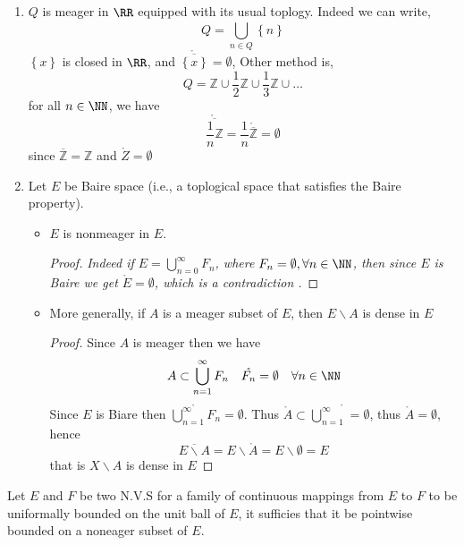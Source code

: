 \begin{example}
\begin{enumerate}
\item $Q $ is meager in $\RR  $ equipped with its usual toplogy.
	Indeed we can write, 
	\[
	Q = \bigcup_{n \in Q}^{}  \left\{ n \right\}
	\]
	$\left\{ x \right\} $  is closed in $\RR  $, and 
	$\mathring{\overline{\left\{ x \right\}}} = \emptyset $, 
	Other method is, 
	\[
	Q = \mathbb{Z} \cup  \frac{1}{2} \mathbb{Z} \cup 
	\frac{1}{3} \mathbb{Z} \cup  \hdots 
	\]
	for all $n \in  \NN $, we have 
	\[
		\mathring{\overline{\frac{1}{n}\mathbb{Z}}} = 
		\frac{1}{n} \mathring{\overline{\mathbb{Z}}} = 
		\emptyset 
	\]
	since $\overline{\mathbb{Z}} = \mathbb{Z} $  and 
	$\mathring{Z} = \emptyset $ 
\item Let $E $ be Baire space (i.e., a toplogical space that satisfies
	the Baire property).  
	\begin{itemize}
		\item $E $ is nonmeager in $E$.
			\begin{proof}
				\it 
	Indeed if $E = \bigcup_{n=0}^{\infty } F_{n} $, where
	$F_{n} = \emptyset,  \forall n \in \NN $, then 
	since $E $ is Baire we get $\mathring{E}=  \emptyset  $, which
	is a contradiction \normalfont.
			\end{proof}
		\item More generally, if 
			$A$ is a meager subset of $E $, then 
			$E \backslash A $  is dense in $E$ 
		\begin{proof}
		Since $A $ is meager then we have 
		\[
		A \subset \bigcup_{n=1}^{\infty } F_{n} \quad 
		\mathring{F_{n}}= \emptyset  \quad 
		\forall n \in \NN 
		\]
		Since $E $ is Biare then 
		$\mathring{\bigcup_{n=1}^{\infty } F_{n}}=\emptyset  $.
		Thus $\mathring{A} \subset \mathring{\bigcup_{n=1}^{\infty } }
		=\emptyset $, thus $\mathring{A}=\emptyset  $, hence
		\[
			\overline{
			E \backslash A} = 
			E \backslash \mathring{A} = 
			E \backslash \emptyset = E
		\]
		that is $X \backslash A $  is dense in $E $ 
		\end{proof}
	\end{itemize}
\end{enumerate}
\end{example}
\begin{theorem}
	Let $E $ and $F $ be two N.V.S for a family of
	continuous mappings 
	from $E $ to $F $ to be uniformally bounded on the unit
	ball of $E $, it sufficies that it be pointwise bounded on
	a noneager subset of $E$. 
\end{theorem}

